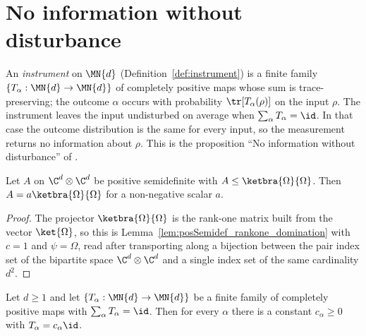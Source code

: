 \section{No information without disturbance}
\label{sec:no_information_without_disturbance}

An \emph{instrument} on $\MN{d}$ (Definition~\ref{def:instrument}) is a finite
family $\{T_\alpha:\MN{d}\to\MN{d}\}$ of completely positive maps whose sum is
trace-preserving; the outcome $\alpha$ occurs with probability
$\tr[T_\alpha(\rho)]$ on the input $\rho$. The instrument leaves the input
undisturbed on average when
$\sum_\alpha T_\alpha=\id$. In that case the outcome distribution is the
same for every input, so the measurement returns no information about
$\rho$. This is the proposition ``No information without disturbance'' of
\cite[Chapter~2]{Wolf2012Quantum}.

\begin{lemma}
    \label{lem:le_omega_proj_eq_nonneg_smul}
    \leanok
    Let $A$ on $\C^d\otimes\C^d$ be positive semidefinite with
    $A\leq\ketbra{\Omega}{\Omega}$. Then $A=a\ketbra{\Omega}{\Omega}$ for a
    non-negative scalar $a$.
\end{lemma}

\begin{proof}
    \leanok
    The projector $\ketbra{\Omega}{\Omega}$ is the rank-one matrix built
    from the vector $\ket{\Omega}$, so this is
    Lemma~\ref{lem:posSemidef_rankone_domination} with $c=1$ and
    $\psi=\Omega$, read after transporting along a bijection between the
    pair index set of the bipartite space $\C^d\otimes\C^d$ and a single
    index set of the same cardinality $d^2$.
\end{proof}

\begin{theorem}
    \label{thm:no_information_without_disturbance}
    \leanok
    Let $d\geq1$ and let $\{T_\alpha:\MN{d}\to\MN{d}\}$ be a finite family of
    completely positive maps with $\sum_\alpha T_\alpha=\id$. Then for every
    $\alpha$ there is a constant $c_\alpha\geq0$ with
    $T_\alpha=c_\alpha\id$.
\end{theorem}

